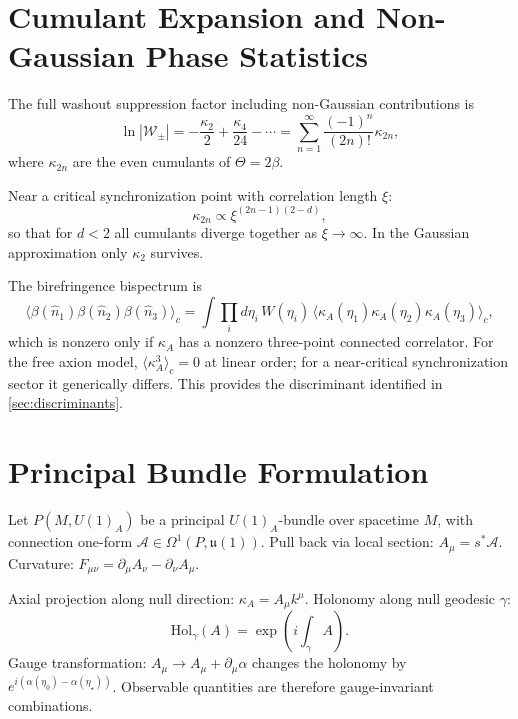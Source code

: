 \documentclass[12pt]{article}
\theoremstyle{definition}
\newcommand{\kA}{\kappa_A}
\newcommand{\etastar}{\eta_\star}
\newcommand{\Wpm}{\mathcal{W}_\pm}
\begin{document}
\section{Cumulant Expansion and Non-Gaussian Phase Statistics}
\label{app:cumulant}

The full washout suppression factor including non-Gaussian contributions is
\begin{equation}
  \ln|\Wpm|
  = -\frac{\kappa_2}{2} + \frac{\kappa_4}{24} - \cdots
  = \sum_{n=1}^\infty\frac{(-1)^n}{(2n)!}\kappa_{2n},
\end{equation}
where $\kappa_{2n}$ are the even cumulants of $\Theta=2\beta$.

Near a critical synchronization point with correlation length $\xi$:
\begin{equation}
  \kappa_{2n}\propto\xi^{(2n-1)(2-d)},
\end{equation}
so that for $d<2$ all cumulants diverge together as $\xi\to\infty$.
In the Gaussian approximation only $\kappa_2$ survives.

The birefringence bispectrum is
\begin{equation}
  \langle\beta(\hat{n}_1)\beta(\hat{n}_2)\beta(\hat{n}_3)\rangle_c
  = \int\prod_i d\eta_i\,W(\eta_i)\,
    \langle\kA(\eta_1)\kA(\eta_2)\kA(\eta_3)\rangle_c,
\end{equation}
which is nonzero only if $\kA$ has a nonzero three-point connected correlator.
For the free axion model, $\langle\kA^3\rangle_c=0$ at linear order;
for a near-critical synchronization sector it generically differs.
This provides the discriminant identified in \cref{sec:discriminants}.

\section{Principal Bundle Formulation}
\label{app:bundle}

Let $P(M,U(1)_A)$ be a principal $U(1)_A$-bundle over spacetime $M$,
with connection one-form $\mathcal{A}\in\Omega^1(P,\mathfrak{u}(1))$.
Pull back via local section: $A_\mu=s^\ast\mathcal{A}$.
Curvature: $F_{\mu\nu}=\partial_\mu A_\nu-\partial_\nu A_\mu$.

Axial projection along null direction: $\kA=A_\mu k^\mu$.
Holonomy along null geodesic $\gamma$:
\begin{equation}
  \mathrm{Hol}_\gamma(A)=\exp\!\left(i\int_\gamma A\right).
\end{equation}
Gauge transformation: $A_\mu\to A_\mu+\partial_\mu\alpha$
changes the holonomy by $e^{i(\alpha(\eta_0)-\alpha(\etastar))}$.
Observable quantities are therefore gauge-invariant combinations.
\end{document}
